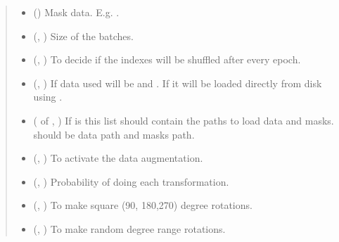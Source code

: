\documentclass[letterpaper,10pt,english]{sphinxmanual}
\begin{document}
\begin{fulllineitems}
\begin{quote}
\begin{description}
\begin{itemize}
\item {} 
 () \textendash{} Mask data. E.g. .

\item {} 
 (, ) \textendash{} Size of the batches.

\item {} 
 (, ) \textendash{} To decide if the indexes will be shuffled after every epoch.

\item {} 
 (, ) \textendash{} If  data used will be  and . If  it will be loaded directly from disk using
.

\item {} 
 ( of , ) \textendash{} If  is  this list should contain the paths to load data and masks. 
should be data path and  masks path.

\item {} 
 (, ) \textendash{} To activate the data augmentation.

\item {} 
 (, ) \textendash{} Probability of doing each transformation.

\item {} 
 (, ) \textendash{} To make square (90, 180,270) degree rotations.

\item {} 
 (, ) \textendash{} To make random degree range rotations.


\end{itemize}
\end{description}
\end{quote}
\end{fulllineitems}
\end{document}
